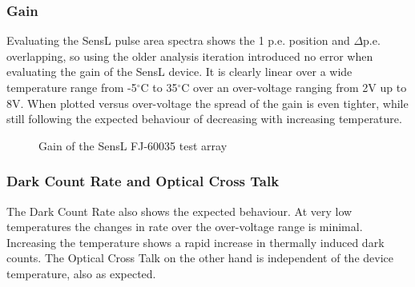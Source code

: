 \documentclass[12pt,article,type=msc,colorback,accentcolor=tud9c]{tudthesis}
\begin{document}
\begin{figure}[h]
\begin{centering}
}
\caption{SensL Test Array and pulse shape at bias-voltage = 29V0}
\label{fig:SensL_Array_PS}
\end{centering}
\end{figure}


\subsubsection{Gain}
\label{subsubsec:SensLGain}

Evaluating the SensL pulse area spectra shows the 1 p.e. position and $\Delta$p.e. overlapping, so using the older analysis iteration introduced no error when evaluating the gain of the SensL device. It is clearly linear over a wide temperature range from -5$^\circ$C to 35$^\circ$C over an over-voltage ranging from 2V up to 8V. When plotted versus over-voltage the spread of the gain is even tighter, while still following the expected behaviour of decreasing with increasing temperature.

\begin{figure}[h]
\begin{centering}
\caption{Gain of the SensL FJ-60035 test array}
\label{fig:SensL_Gain}
\end{centering}
\end{figure}


\subsubsection{Dark Count Rate and Optical Cross Talk}
\label{subsubsec:SensL_DCROCT}
The Dark Count Rate also shows the expected behaviour. At very low temperatures the changes in rate over the over-voltage range is minimal. Increasing the temperature shows a rapid increase in thermally induced dark counts. The Optical Cross Talk on the other hand is independent of the device temperature, also as expected. 
\end{document}
